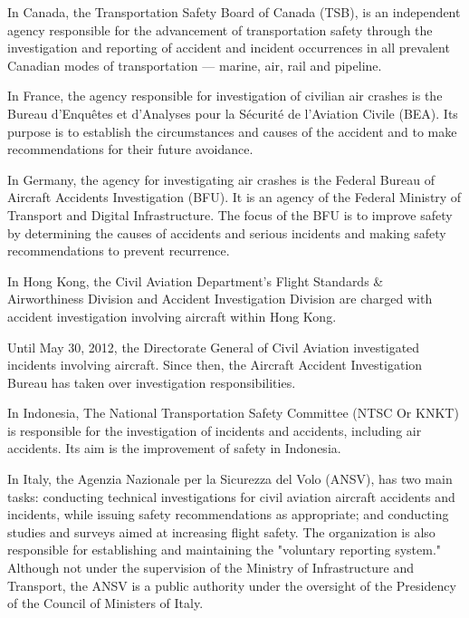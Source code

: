 \documentclass[a4paper, 10pt]{article}
\begin{document}
In Canada, the Transportation Safety Board of Canada (TSB), is an independent agency responsible for the advancement of transportation safety through the investigation and reporting of accident and incident occurrences in all prevalent Canadian modes of transportation — marine, air, rail and pipeline.\par

In France, the agency responsible for investigation of civilian air crashes is the Bureau d'Enquêtes et d'Analyses pour la Sécurité de l'Aviation Civile (BEA). Its purpose is to establish the circumstances and causes of the accident and to make recommendations for their future avoidance.\par

In Germany, the agency for investigating air crashes is the Federal Bureau of Aircraft Accidents Investigation (BFU). It is an agency of the Federal Ministry of Transport and Digital Infrastructure. The focus of the BFU is to improve safety by determining the causes of accidents and serious incidents and making safety recommendations to prevent recurrence.\par

In Hong Kong, the Civil Aviation Department's Flight Standards \& Airworthiness Division and Accident Investigation Division are charged with accident investigation involving aircraft within Hong Kong.\par

Until May 30, 2012, the Directorate General of Civil Aviation investigated incidents involving aircraft. Since then, the Aircraft Accident Investigation Bureau has taken over investigation responsibilities.\par

In Indonesia, The National Transportation Safety Committee (NTSC Or KNKT) is responsible for the investigation of incidents and accidents, including air accidents. Its aim is the improvement of safety in Indonesia.\par

In Italy, the Agenzia Nazionale per la Sicurezza del Volo (ANSV), has two main tasks: conducting technical investigations for civil aviation aircraft accidents and incidents, while issuing safety recommendations as appropriate; and conducting studies and surveys aimed at increasing flight safety. The organization is also responsible for establishing and maintaining the "voluntary reporting system." Although not under the supervision of the Ministry of Infrastructure and Transport, the ANSV is a public authority under the oversight of the Presidency of the Council of Ministers of Italy.\par
\end{document}
